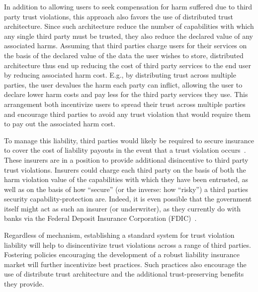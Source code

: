 In addition to allowing users to seek compensation for harm suffered
due to third party trust violations, this approach also favors the use
of distributed trust architecture. Since such architecture reduce the
number of capabilities with which any single third party must be
trusted, they also reduce the declared value of any associated
harms. Assuming that third parties charge users for their services on
the basis of the declared value of the data the user wishes to store,
distributed architecture thus end up reducing the cost of third party
services to the end user by reducing associated harm cost. E.g., by
distributing trust across multiple parties, the user devalues the harm
each party can inflict, allowing the user to declare lower harm costs
and pay less for the third party services they use. This arrangement
both incentivize users to spread their trust across multiple parties
and encourage third parties to avoid any trust violation that would
require them to pay out the associated harm cost.

To manage this liability, third parties would likely be required to
secure insurance to cover the cost of liability payouts in the event
that a trust violation occurs~\cite{ciab2015, starks2016}. These
insurers are in a position to provide additional disincentive to third
party trust violations. Insurers could charge each third party on the
basis of both the harm violation value of the capabilities with which
they have been entrusted, as well as on the basis of how ``secure''
(or the inverse: how ``risky'') a third parties security
capability-protection are. Indeed, it is even possible that the
government itself might act as such an insurer (or underwriter), as
they currently do with banks via the Federal Deposit Insurance
Corporation (FDIC)~\cite{fdic}.

Regardless of mechanism, establishing a standard system for trust
violation liability will help to disincentivize trust violations
across a range of third parties. Fostering policies encouraging the
development of a robust liability insurance market will further
incentivize best practices. Such practices also encourage the use of
distribute trust architecture and the additional trust-preserving
benefits they provide.


